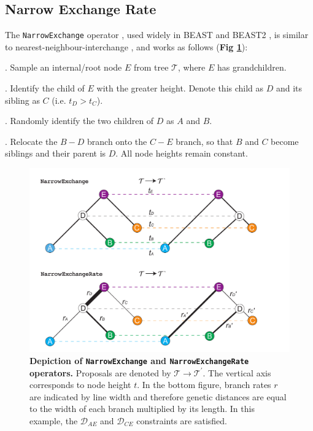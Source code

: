 \documentclass[10pt,letterpaper]{article}
\begin{document}
\subsection*{Narrow Exchange Rate} \label{sect:NER}

The \texttt{NarrowExchange} operator \cite{drummond2002estimating}, used widely in BEAST \cite{drummond2012bayesian,suchard2018bayesian} and BEAST2 \cite{bouckaert2019beast}, is similar to nearest-neighbour-interchange \cite{semple2003phylogenetics}, and works as follows (\textbf{Fig \ref{fig:narrowexchange}}):

. Sample an internal/root node $E$ from tree $\mathcal{T}$, where $E$ has grandchildren.

. Identify the child of $E$ with the greater height. Denote this child as $D$ and its sibling as $C$ (i.e. $t_D > t_C$).

. Randomly identify the two children of $D$ as $A$ and $B$.

. Relocate the $B-D$ branch onto the $C-E$ branch, so that $B$ and $C$ become siblings and their parent is $D$. All node heights remain constant.


\begin{figure}[!h]
\includegraphics[width=\textwidth]{Figures/NarrowExchange.pdf}
\caption{\textbf{Depiction of \texttt{NarrowExchange} and \texttt{NarrowExchangeRate} operators.} Proposals are denoted by $\mathcal{T} \rightarrow \mathcal{T}^\prime$. The vertical axis corresponds to node height $t$. In the bottom figure, branch rates $r$ are indicated by line width and therefore genetic distances are equal to the width of each branch multiplied by its length. In this example, the $\mathcal{D}_{AE}$ and $\mathcal{D}_{CE}$ constraints are satisfied.}
\label{fig:narrowexchange}
\end{figure}
\end{document}

